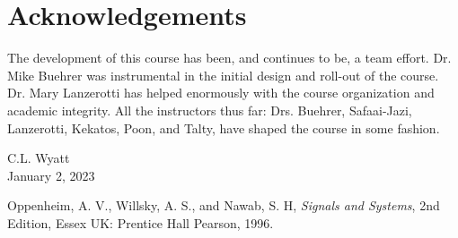 \documentclass[]{book}
\theoremstyle{definition}
\numberwithin{section}{chapter}
\numberwithin{equation}{chapter}
\begin{document}
\section*{Acknowledgements}
The development of this course has been, and continues to be, a team effort. Dr. Mike Buehrer was instrumental in the initial design and roll-out of the course. Dr. Mary Lanzerotti has helped enormously with the course organization and academic integrity. All the instructors thus far: Drs. Buehrer, Safaai-Jazi, Lanzerotti, Kekatos, Poon, and Talty, have shaped the course in some fashion.

\vspace{2em}
\begin{flushright}
C.L. Wyatt\\
January 2, 2023
\end{flushright}


\tableofcontents
\mainmatter
























\appendix


\backmatter

\begin{thebibliography}{9}

  Oppenheim, A. V., Willsky, A. S., and Nawab, S. H, \textit{Signals and Systems}, 2nd Edition, Essex UK: Prentice Hall Pearson, 1996.

\end{thebibliography}

\printindex
\end{document}
